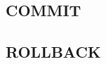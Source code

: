 \documentclass[14pt,fleqn]{extbook} %
\begin{document}
\subsection{COMMIT}

\subsection{ROLLBACK}

%
%

%
%
%
%
%
%
%
%
\end{document}

